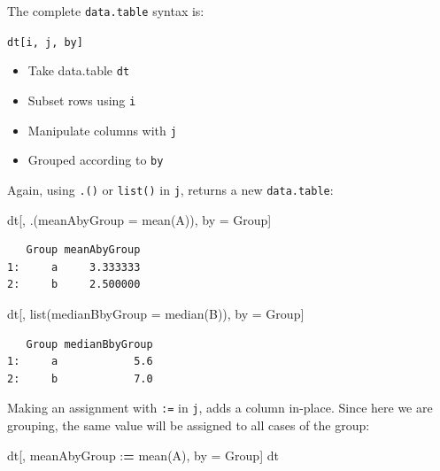 \documentclass[
]{book}
\makeatletter
\newenvironment{Shaded}{\begin{snugshade}}{\end{snugshade}}
\newcommand{\AttributeTok}[1]{\textcolor[rgb]{0.77,0.63,0.00}{#1}}
\newcommand{\ErrorTok}[1]{\textcolor[rgb]{0.64,0.00,0.00}{\textbf{#1}}}
\newcommand{\FunctionTok}[1]{\textcolor[rgb]{0.00,0.00,0.00}{#1}}
\newcommand{\NormalTok}[1]{#1}
\newcommand{\OtherTok}[1]{\textcolor[rgb]{0.56,0.35,0.01}{#1}}
\newcommand{\SpecialCharTok}[1]{\textcolor[rgb]{0.00,0.00,0.00}{#1}}
\providecommand{\tightlist}{%
  \setlength{\itemsep}{0pt}\setlength{\parskip}{0pt}}
\newenvironment{kframe}{%
\medskip{}
\setlength{\fboxsep}{.8em}
 \def\at@end@of@kframe{}%
 \ifinner\ifhmode%
  \def\at@end@of@kframe{\end{minipage}}%
  \begin{minipage}{\columnwidth}%
 \fi\fi%
 \def\FrameCommand##1{\hskip\@totalleftmargin \hskip-\fboxsep
 \colorbox{shadecolor}{##1}\hskip-\fboxsep
     \hskip-\linewidth \hskip-\@totalleftmargin \hskip\columnwidth}%
 \MakeFramed {\advance\hsize-\width
   \@totalleftmargin\z@ \linewidth\hsize
   \@setminipage}}%
 {\par\unskip\endMakeFramed%
 \at@end@of@kframe}
\newenvironment{rmdblock}[1]
  {
  \begin{itemize}
  \renewcommand{\labelitemi}{
    \raisebox{-.7\height}[0pt][0pt]{
      {\setkeys{Gin}{width=3em,keepaspectratio}\texttt{[image: images/\#1]}}
    }
  }
  \setlength{\fboxsep}{1em}
  \begin{kframe}
  \item
  }
  {
  \end{kframe}
  \end{itemize}
  }
\newenvironment{info}
  {\begin{rmdblock}{info}}
  {\end{rmdblock}}
\makeatother
\begin{document}
\begin{info}
The complete \texttt{data.table} syntax is:

\texttt{dt{[}i,\ j,\ by{]}}

\begin{itemize}
\tightlist
\item
  Take data.table \texttt{dt}
\item
  Subset rows using \texttt{i}
\item
  Manipulate columns with \texttt{j}
\item
  Grouped according to \texttt{by}
\end{itemize}
\end{info}

Again, using \texttt{.()} or \texttt{list()} in \texttt{j}, returns a new \texttt{data.table}:

\begin{Shaded}
\begin{Highlighting}[]
\NormalTok{dt[, .(}\AttributeTok{meanAbyGroup =} \FunctionTok{mean}\NormalTok{(A)), by }\OtherTok{=}\NormalTok{ Group]}
\end{Highlighting}
\end{Shaded}

\begin{verbatim}
   Group meanAbyGroup
1:     a     3.333333
2:     b     2.500000
\end{verbatim}

\begin{Shaded}
\begin{Highlighting}[]
\NormalTok{dt[, }\FunctionTok{list}\NormalTok{(}\AttributeTok{medianBbyGroup =} \FunctionTok{median}\NormalTok{(B)), by }\OtherTok{=}\NormalTok{ Group]}
\end{Highlighting}
\end{Shaded}

\begin{verbatim}
   Group medianBbyGroup
1:     a            5.6
2:     b            7.0
\end{verbatim}

Making an assignment with \texttt{:=} in \texttt{j}, adds a column in-place. Since here we are grouping, the same value will be assigned to all cases of the group:

\begin{Shaded}
\begin{Highlighting}[]
\NormalTok{dt[, meanAbyGroup }\SpecialCharTok{:}\ErrorTok{=} \FunctionTok{mean}\NormalTok{(A), by }\OtherTok{=}\NormalTok{ Group]}
\NormalTok{dt}
\end{Highlighting}
\end{Shaded}
\end{document}
